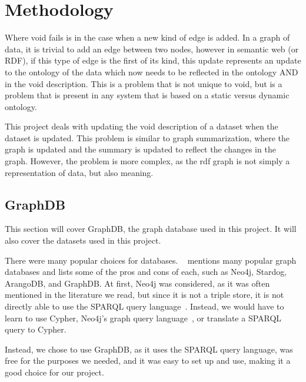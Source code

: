 \section{Methodology}\label{sec:methodology}


Where \gls{void} fails is in the case when a new kind of edge is added. In a graph of data, it is trivial to add an edge between two nodes, however in semantic web (or RDF), if this type of edge is the first of its kind, this update represents an update to the ontology of the data which now needs to be reflected in the ontology AND in the \gls{void} description. This is a problem that is not unique to \gls{void}, but is a problem that is present in any system that is based on a static versus dynamic ontology.


This project deals with updating the \gls{void} description of a dataset when the dataset is updated. This problem is similar to graph summarization, where the graph is updated and the summary is updated to reflect the changes in the graph. However, the problem is more complex, as the \gls{rdf} graph is not simply a representation of data, but also meaning.

\subsection{GraphDB}\label{sec:graphdb}
This section will cover GraphDB, the graph database used in this project. It will also cover the datasets used in this project.

There were many popular choices for databases. ~ \cite{best-graph-databases} mentions many popular graph databases and lists some of the pros and cons of each, such as Neo4j, Stardog, ArangoDB, and GraphDB. At first, Neo4j was considered, as it was often mentioned in the literature we read, but since it is not a triple store, it is not directly able to use the SPARQL query language~\cite{neo4j:-a-reasonable-RDF-graph-database}. Instead, we would have to learn to use Cypher, Neo4j's graph query language~\cite{cypher-query-language}, or translate a SPARQL query to Cypher.

Instead, we chose to use GraphDB, as it uses the SPARQL query language, was free for the purposes we needed, and it was easy to set up and use, making it a good choice for our project.

